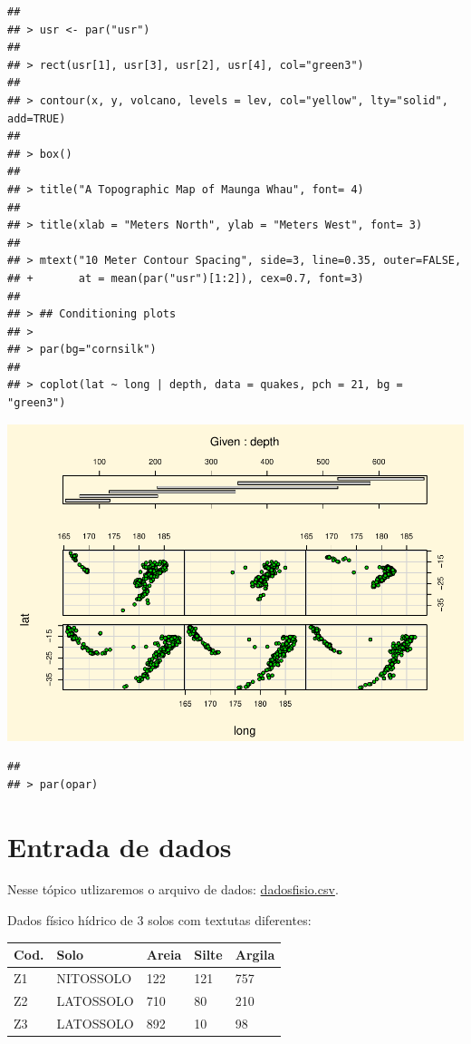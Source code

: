 \documentclass[
]{book}
\begin{document}
\begin{verbatim}
## 
## > usr <- par("usr")
## 
## > rect(usr[1], usr[3], usr[2], usr[4], col="green3")
## 
## > contour(x, y, volcano, levels = lev, col="yellow", lty="solid", add=TRUE)
## 
## > box()
## 
## > title("A Topographic Map of Maunga Whau", font= 4)
## 
## > title(xlab = "Meters North", ylab = "Meters West", font= 3)
## 
## > mtext("10 Meter Contour Spacing", side=3, line=0.35, outer=FALSE,
## +       at = mean(par("usr")[1:2]), cex=0.7, font=3)
## 
## > ## Conditioning plots
## > 
## > par(bg="cornsilk")
## 
## > coplot(lat ~ long | depth, data = quakes, pch = 21, bg = "green3")
\end{verbatim}

\includegraphics{TudodoR_files/figure-latex/unnamed-chunk-147-11.pdf}

\begin{verbatim}
## 
## > par(opar)
\end{verbatim}

\hypertarget{entrada-de-dados-1}{%
\section{Entrada de dados}\label{entrada-de-dados-1}}

Nesse tópico utlizaremos o arquivo de dados: \href{https://www.dropbox.com/s/zg7fyg1iewtji49/dadosfisio.csv?dl=1}{dadosfisio.csv}.

Dados físico hídrico de 3 solos com textutas diferentes:

\begin{longtable}[]{@{}lllll@{}}
\toprule
Cod. & Solo & Areia & Silte & Argila\tabularnewline
\midrule
\endhead
Z1 & NITOSSOLO & 122 & 121 & 757\tabularnewline
Z2 & LATOSSOLO & 710 & 80 & 210\tabularnewline
Z3 & LATOSSOLO & 892 & 10 & 98\tabularnewline
\bottomrule
\end{longtable}
\end{document}
